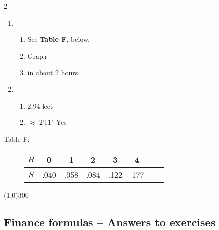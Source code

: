 \begin{multicols} {2}
\begin{enumerate}
\item %
\begin{enumerate}
\item See \textbf{Table F}, below. 
\item Graph
\item in about 2 hours
\end{enumerate}

\item %
\begin{enumerate}
\item 2.94 feet
\item $\approx$ 2'11" Yes
\end{enumerate}

\end{enumerate}
\end{multicols}

\bigskip
\begin{description}
\item[\quad Table F: \quad] 
\begin{tabular} {|c| |c|c |c|c |c|c |c|}\hline
$H$ & 0 & 1 & 2 & 3 & 4\\ \hline
$S$ & .040 & .058 & .084 & .122 & .177 \\ \hline
\end{tabular}
\end{description}
\bigskip

\begin{center}
\line(1,0){300} %
\end{center}

\subsection {Finance formulas -- Answers to exercises} %

